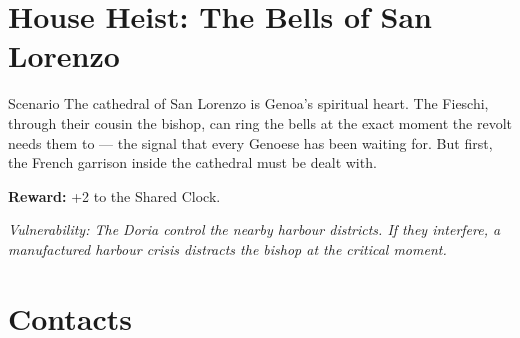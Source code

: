 \section{House Heist: The Bells of San Lorenzo}
\label{sec:fieschi-heist}


\begin{rulebox}[FieschiGreen]{Scenario}
The cathedral of San Lorenzo is Genoa's spiritual heart. The Fieschi,
through their cousin the bishop, can ring the bells at the exact moment
the revolt needs them to --- the signal that every Genoese has been
waiting for. But first, the French garrison inside the cathedral
must be dealt with.
\end{rulebox}




\textbf{Reward:} +2 to the Shared Clock.

\textit{Vulnerability: The Doria control the nearby harbour districts.
If they interfere, a manufactured harbour crisis distracts the bishop
at the critical moment.}

\section{Contacts}

